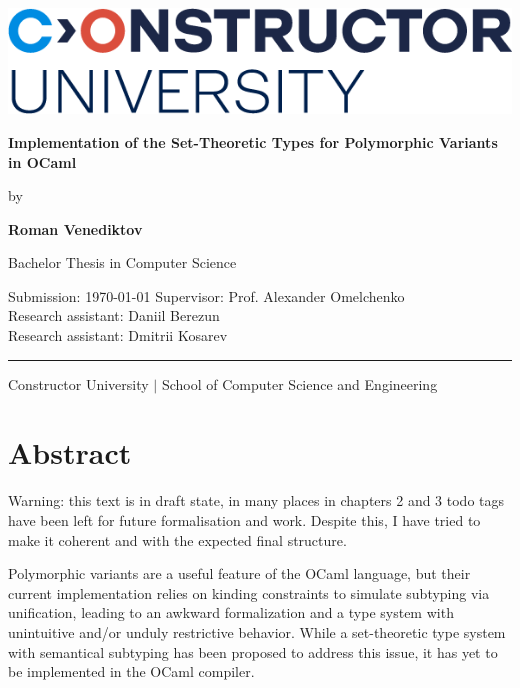 \documentclass[a4paper,11pt,oneside]{article}
\theoremstyle{definition}
\newcommand{\mylastname}{Venediktov}
\newcommand{\myfirstname}{Roman}
\newcommand{\myname}{\myfirstname{} \mylastname{}}
\newcommand{\mytitle}{Implementation of the Set-Theoretic Types
                      for Polymorphic Variants in OCaml}
\newcommand{\mysupervisor}{Prof. Alexander Omelchenko}
\newcommand{\myrao}{Daniil Berezun}
\newcommand{\myrat}{Dmitrii Kosarev}
\begin{document}

\thispagestyle{empty}

\begin{flushright}
  \includegraphics[scale=0.8]{bsc-logo}
\end{flushright}
\vspace*{40mm}
\begin{center}
  \huge
  \textbf{\mytitle}
\end{center}
\vspace*{4mm}
\begin{center}
  \Large by
\end{center}
\vspace*{4mm}
\begin{center}
  \LARGE
  \textbf{\myname}
\end{center}
\vspace*{20mm}
\begin{center}
  \Large
  Bachelor Thesis in Computer Science
\end{center}
\vfill
\begin{flushleft}
  \large
  Submission: \today \hfill
  Supervisor: \mysupervisor\\ \hfill
  Research assistant: \myrao\\ \hfill
  Research assistant: \myrat\\
  \rule{\textwidth}{1pt}
\end{flushleft}
\begin{center}
  Constructor University $|$
  School of Computer Science and Engineering
\end{center}

\newpage

\section*{Abstract}

Warning: this text is in draft state, in many places in chapters
2 and 3 todo tags have been left for future formalisation and work.
Despite this, I have tried to make it coherent and with the expected
final structure.

Polymorphic variants are a useful feature of the OCaml language, but
their current implementation relies on kinding constraints to simulate
subtyping via unification, leading to an awkward formalization and a
type system with unintuitive and/or unduly restrictive behavior. While
a set-theoretic type system\cite{Castagna_2016} with semantical subtyping
has been proposed to address this issue, it has yet to be implemented in
the OCaml compiler.
\end{document}
